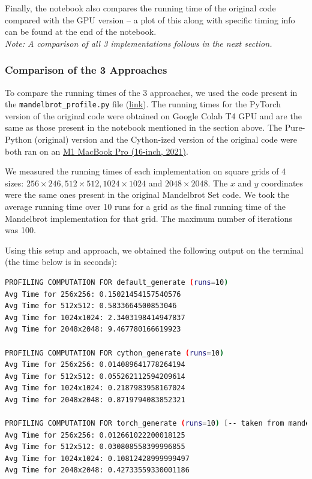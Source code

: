 \documentclass[a4paper,12pt]{article}
\begin{document}
Finally, the notebook also compares the running time of the original code compared with the GPU version -- a plot of this along with specific timing info can be found at the end of the notebook. \\
\textit{Note: A comparison of all 3 implementations follows in the next section.}

\subsubsection{Comparison of the 3 Approaches}
To compare the running times of the 3 approaches, we used the code present in the \verb|mandelbrot_profile.py| file (\href{https://github.com/paulmyr/DD2358-HPC25/blob/master/03_compgpu/bonus/mandelbrot_profile.py}{link}). The running times for the PyTorch version of the original code were obtained on Google Colab T4 GPU and are the same as those present in the notebook mentioned in the section above. The Pure-Python (original) version and the Cython-ized version of the original code were both ran on an \underline{M1 MacBook Pro (16-inch, 2021)}. 

We measured the running times of each implementation on square grids of 4 sizes: $256 \times 246, 512 \times 512, 1024 \times 1024$ and $2048 \times 2048$. The $x$ and $y$ coordinates were the same ones present in the original Mandelbrot Set code. We took the average running time over 10 runs for a grid as the final running time of the Mandelbrot implementation for that grid. The maximum number of iterations was 100.

Using this setup and approach, we obtained the following output on the terminal (the time below is in seconds): 

\begin{lstlisting}[language=bash,basicstyle=\tiny\ttfamily]
PROFILING COMPUTATION FOR default_generate (runs=10)
Avg Time for 256x256: 0.15021454157540576
Avg Time for 512x512: 0.5833664500853046
Avg Time for 1024x1024: 2.3403198414947837
Avg Time for 2048x2048: 9.467780166619923

PROFILING COMPUTATION FOR cython_generate (runs=10)
Avg Time for 256x256: 0.014089641778264194
Avg Time for 512x512: 0.055262112594209614
Avg Time for 1024x1024: 0.2187983958167024
Avg Time for 2048x2048: 0.8719794083852321

PROFILING COMPUTATION FOR torch_generate (runs=10) [-- taken from mandelbrot_torch.ipynb notebook]
Avg Time for 256x256: 0.012661022200018125
Avg Time for 512x512: 0.030808558399996855
Avg Time for 1024x1024: 0.10812428999999497
Avg Time for 2048x2048: 0.42733559330001186
\end{lstlisting}
\end{document}
